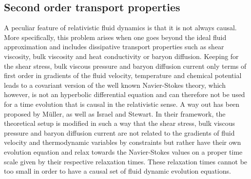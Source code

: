 
%
%


\subsection{Second order transport properties}
A peculiar feature of relativistic fluid dynamics is that it is not always causal. More specifically,  this problem arises when one goes beyond the ideal fluid approximation and includes dissipative transport properties such as shear viscosity,  bulk viscosity and heat conductivity or baryon diffusion. Keeping for the shear stress,  bulk viscous pressure and baryon diffusion current only terms of first order in gradients of the fluid velocity,  temperature and chemical potential leads to a covariant version of the well known Navier-Stokes theory,  which however,  is not an hyperbolic differential equation and can therefore not be used for a time evolution that is causal in the relativistic sense. A way out has been proposed by Müller,  as well as Israel and Stewart. In their framework,  the theoretical setup is modified in such a way that the shear stress,  bulk viscous pressure and baryon diffusion current are not related to the gradients of fluid velocity and thermodynamic variables by constraints but rather have their own evolution equation and relax towards the Navier-Stokes values on a proper time scale given by their respective relaxation times. These relaxation times cannot be too small in order to have a causal set of fluid dynamic evolution equations.

